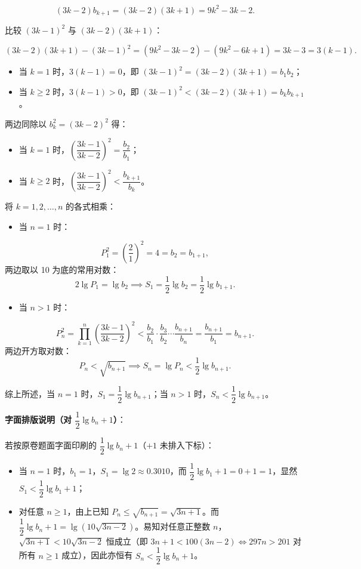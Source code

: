 \begin{answer}
\nopagebreak[4]
\[
(3k-2) b_{k+1} = (3k-2)(3k+1) = 9k^2 - 3k - 2.
\]

比较 $(3k-1)^2$ 与 $(3k-2)(3k+1)$：

\nopagebreak[4]
\[
(3k-2)(3k+1) - (3k-1)^2 = (9k^2 - 3k - 2) - (9k^2 - 6k + 1) = 3k - 3 = 3(k-1).
\]

\begin{itemize}
\item 当 $k=1$ 时，$3(k-1) = 0$，即 $(3k-1)^2 = (3k-2)(3k+1) = b_1 b_2$；
\item 当 $k \ge 2$ 时，$3(k-1) > 0$，即 $(3k-1)^2 < (3k-2)(3k+1) = b_k b_{k+1}$。
\end{itemize}

两边同除以 $b_k^2 = (3k-2)^2$ 得：

\begin{itemize}
\item 当 $k=1$ 时，$\left(\dfrac{3k-1}{3k-2}\right)^2 = \dfrac{b_2}{b_1}$；
\item 当 $k \ge 2$ 时，$\left(\dfrac{3k-1}{3k-2}\right)^2 < \dfrac{b_{k+1}}{b_k}$。
\end{itemize}

将 $k=1, 2, \dots, n$ 的各式相乘：

\begin{itemize}
\item 当 $n=1$ 时：
\end{itemize}
\nopagebreak[4]
\[
P_1^2 = \left(\frac{2}{1}\right)^2 = 4 = b_2 = b_{1+1},
\]
  两边取以 10 为底的常用对数：
\nopagebreak[4]
\[
2\lg P_1 = \lg b_2 \implies S_1 = \frac12\lg b_2 = \frac12\lg b_{1+1}.
\]
\begin{itemize}
\item 当 $n > 1$ 时：
\end{itemize}
\nopagebreak[4]
\[
P_n^2 = \prod_{k=1}^n \left(\frac{3k-1}{3k-2}\right)^2 < \frac{b_2}{b_1} \cdot \frac{b_3}{b_2} \cdots \frac{b_{n+1}}{b_n} = \frac{b_{n+1}}{b_1} = b_{n+1}.
\]
  两边开方取对数：
\nopagebreak[4]
\[
P_n < \sqrt{b_{n+1}} \implies S_n = \lg P_n < \frac12\lg b_{n+1}.
\]

综上所述，当 $n=1$ 时，$S_1 = \dfrac12\lg b_{n+1}$；当 $n>1$ 时，$S_n < \dfrac12\lg b_{n+1}$。

\textbf{字面排版说明（对 $\dfrac12\lg b_n + 1$）}：

若按原卷题面字面印刷的 $\dfrac12\lg b_n + 1$（$+1$ 未排入下标）：

\begin{itemize}
\item 当 $n=1$ 时，$b_1=1$，$S_1 = \lg 2 \approx 0.3010$，而 $\dfrac12\lg b_1 + 1 = 0 + 1 = 1$，显然 $S_1 < \dfrac12\lg b_1 + 1$；
\item 对任意 $n \ge 1$，由上已知 $P_n \le \sqrt{b_{n+1}} = \sqrt{3n+1}$。而 $\dfrac12\lg b_n + 1 = \lg(10\sqrt{3n-2})$。易知对任意正整数 $n$，$\sqrt{3n+1} < 10\sqrt{3n-2}$ 恒成立（即 $3n+1 < 100(3n-2) \iff 297n > 201$ 对所有 $n\ge1$ 成立），因此亦恒有 $S_n < \dfrac12\lg b_n + 1$。
\end{itemize}



\end{answer}